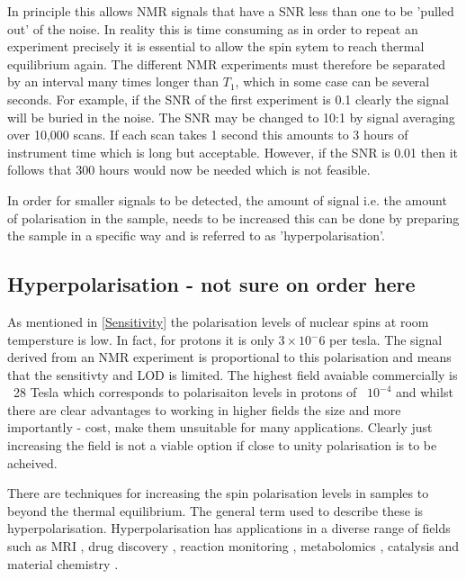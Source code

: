   In principle this allows NMR signals that have a SNR less than one to be 'pulled out' of the noise. In reality this is
  time consuming as in order to repeat an experiment precisely it is essential to allow the spin sytem to
  reach thermal equilibrium again. The different NMR experiments must therefore be separated by an interval
  many times longer than $T_1$, which in some case can be several seconds. For example, if the SNR of the first
  experiment is 0.1 clearly the signal will be buried in the noise. The SNR may be changed to 10:1 by signal averaging
  over 10,000 scans. If each scan takes 1 second this amounts to 3 hours of instrument time which is long but
  acceptable. However, if the SNR is 0.01 then it follows that 300 hours would now be needed which is not feasible.

  In order for smaller signals to be detected, the amount of signal i.e. the amount of polarisation in the sample,
  needs to be increased this can be done by preparing the sample in a specific way and is referred to as
  'hyperpolarisation'.

\subsection{Hyperpolarisation - not sure on order here}

 As mentioned in \ref{Sensitivity} the polarisation levels of nuclear spins at room tempersture is low. In fact,
 for protons it is only $3\times10{^-6}$ per tesla\citep{RN138}. The signal derived from an NMR experiment
 is proportional to this polarisation and means that the sensitivty and LOD is limited. The highest
 field avaiable commercially is ~28 Tesla which corresponds to polarisaiton levels in protons of ~$10^{-4}$ and
 whilst there are clear advantages to working in higher fields the size and more importantly - cost, make them unsuitable for many applications. Clearly just increasing the field is not a viable
 option if close to unity polarisation is to be
 acheived.

 There are techniques for increasing the spin polarisation levels in samples to beyond the thermal
 equilibrium. The general term used to describe these is hyperpolarisation. Hyperpolarisation has
 applications in a diverse range of fields such as MRI \citep{RN139,RN140,RN151,RN152}, drug discovery
 \citep{RN141,RN142}, reaction monitoring \citep{RN143,RN144,RN145}, metabolomics \citep{RN147,RN148},
 catalysis\citep{RN149, RN150} and material chemistry \citep{RN153,piveteau2015structure,RN154}.

